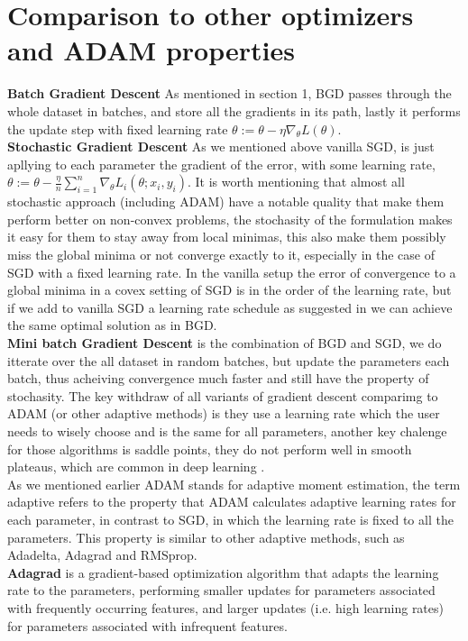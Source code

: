 \documentclass[10pt,a4paper]{article}
\begin{document}
\section{Comparison to other optimizers and ADAM properties}
\textbf{Batch Gradient Descent} As mentioned in section 1, BGD passes through the whole dataset in batches, and store all the gradients in its path, lastly it performs the update step with fixed learning rate $\theta:=\theta-\eta \nabla_\theta L(\theta)$. \\
\textbf{Stochastic Gradient Descent} As we mentioned above vanilla SGD, is just apllying to each parameter the gradient of the error, with some learning rate, $\theta:=\theta-\frac{\eta}{n}\sum_{i=1}^{n}\nabla_\theta L_i(\theta;x_i,y_i)$. It is worth mentioning that almost all stochastic approach (including ADAM) have a notable quality that make them perform better on non-convex problems, the stochasity of the formulation makes it easy for them to stay away from local minimas, this also make them possibly miss the global minima or not converge exactly to it, especially in the case of SGD with a fixed learning rate. In the vanilla setup the error of convergence to a global minima in a covex setting of SGD is in the order of the learning rate, but if we add to vanilla SGD a learning rate schedule as suggested in \cite{darken1992learning} we can achieve the same optimal solution as in BGD.\\
\textbf{Mini batch Gradient Descent} is the combination of BGD and SGD, we do itterate over the all dataset in random batches, but update the parameters each batch, thus acheiving convergence much faster and still have the property of stochasity.
The key withdraw of all variants of gradient descent comparimg to ADAM (or other adaptive methods) is they use a learning rate which the user needs to wisely choose and is the same for all parameters, another key chalenge for those algorithms is saddle points, they do not perform well in smooth plateaus, which are common in deep learning \cite{dauphin2014identifying}.\\
As we mentioned earlier ADAM stands for adaptive moment estimation, the term adaptive refers to the property that ADAM calculates adaptive learning rates for each parameter, in contrast to SGD, in which the learning rate is fixed to all the parameters. This property is similar to other adaptive methods, such as Adadelta, Adagrad and RMSprop.\\
\textbf{Adagrad} is a gradient-based optimization algorithm that adapts the learning rate to the parameters, performing smaller updates for parameters associated with frequently occurring features, and larger updates (i.e. high learning rates) for parameters associated with infrequent features.\\
\end{document}
